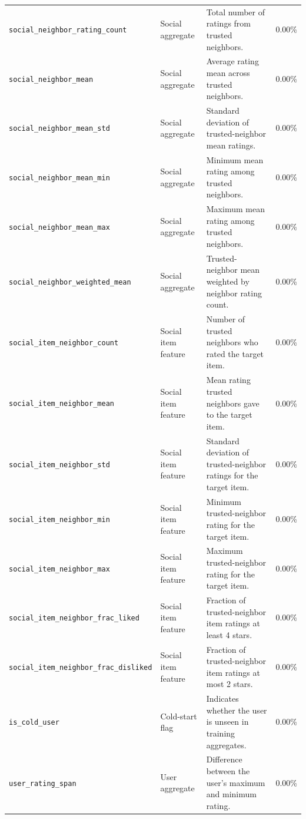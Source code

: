 \documentclass[conference]{IEEEtran}
\begin{document}
\begin{table}[htbp]
\begin{tabular}{p{6.5cm}p{2.4cm}p{7.1cm}p{1.3cm}}
\raggedright\texttt{social\_neighbor\_rating\_count} & Social aggregate & Total number of ratings from trusted neighbors. & 0.00\% \\
\raggedright\texttt{social\_neighbor\_mean} & Social aggregate & Average rating mean across trusted neighbors. & 0.00\% \\
\raggedright\texttt{social\_neighbor\_mean\_std} & Social aggregate & Standard deviation of trusted-neighbor mean ratings. & 0.00\% \\
\raggedright\texttt{social\_neighbor\_mean\_min} & Social aggregate & Minimum mean rating among trusted neighbors. & 0.00\% \\
\raggedright\texttt{social\_neighbor\_mean\_max} & Social aggregate & Maximum mean rating among trusted neighbors. & 0.00\% \\
\raggedright\texttt{social\_neighbor\_weighted\_mean} & Social aggregate & Trusted-neighbor mean weighted by neighbor rating count. & 0.00\% \\
\raggedright\texttt{social\_item\_neighbor\_count} & Social item feature & Number of trusted neighbors who rated the target item. & 0.00\% \\
\raggedright\texttt{social\_item\_neighbor\_mean} & Social item feature & Mean rating trusted neighbors gave to the target item. & 0.00\% \\
\raggedright\texttt{social\_item\_neighbor\_std} & Social item feature & Standard deviation of trusted-neighbor ratings for the target item. & 0.00\% \\
\raggedright\texttt{social\_item\_neighbor\_min} & Social item feature & Minimum trusted-neighbor rating for the target item. & 0.00\% \\
\raggedright\texttt{social\_item\_neighbor\_max} & Social item feature & Maximum trusted-neighbor rating for the target item. & 0.00\% \\
\raggedright\texttt{social\_item\_neighbor\_frac\_liked} & Social item feature & Fraction of trusted-neighbor item ratings at least 4 stars. & 0.00\% \\
\raggedright\texttt{social\_item\_neighbor\_frac\_disliked} & Social item feature & Fraction of trusted-neighbor item ratings at most 2 stars. & 0.00\% \\
\raggedright\texttt{is\_cold\_user} & Cold-start flag & Indicates whether the user is unseen in training aggregates. & 0.00\% \\
\raggedright\texttt{user\_rating\_span} & User aggregate & Difference between the user's maximum and minimum rating. & 0.00\% \\

\end{tabular}
\end{table}
\end{document}
